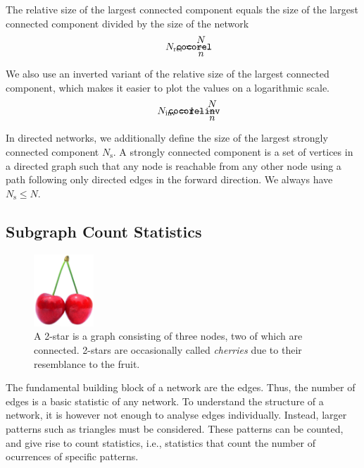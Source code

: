 \documentclass{article}
\def\mathnote#1{%
  \tag*{\rlap{\hspace\marginparsep\smash{\parbox[t]{\marginparwidth}{#1}}}}
}
\begin{document}
The relative size of the largest connected component equals the
size of the largest connected component divided by the size of the
network
\begin{align}
  \mathnote{\texttt{cocorel}}
  N_{\mathrm{rel}} &= \frac N n. 
\end{align}

We also use an inverted variant of the relative size of the largest
connected component, which makes it easier to plot the values on a
logarithmic scale.
\begin{align}
  \mathnote{\texttt{cocorelinv}}
  N_{\mathrm{inv}} &= 1 - \frac N n 
\end{align}

In directed networks, we additionally define the size of the largest
strongly connected component $N_{\mathrm s}$.  A strongly
connected component is a 
set of vertices in a directed graph such that any node is reachable from
any other node using a path following only directed edges in the forward
direction.   We always have $N_{\mathrm s} \leq N$. 

\subsection{Subgraph Count Statistics}
\label{sec:count-statistics}
\begin{figure}
  \centering
  \includegraphics[width=0.20\textwidth]{img/Cherry_Stella444.jpg}
  \caption{
    A 2-star is a graph consisting of three nodes, two of which are
    connected.  2-stars are occasionally called \emph{cherries} due to
    their resemblance to the fruit.
    \label{fig:cherries}
  }
\end{figure}
The fundamental building block of a network are the edges.  Thus, the
number of edges is a basic statistic of any network.  To understand the
structure of a network, it is however not enough to analyse edges
individually.  Instead, larger patterns such as triangles must be
considered.  These patterns can be counted, and give rise to count
statistics, i.e., statistics that count the number of ocurrences of
specific patterns. 
\end{document}
